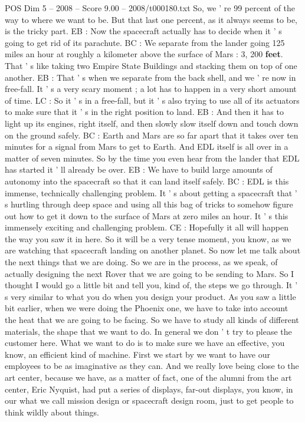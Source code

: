 \begin{textsample}{POS Dim 5 – 2008 – Score 9.00 – 2008/t000180.txt}
So, we ' re 99 percent of the way to where we want to be.
But that last one percent, as it always seems to be, is the tricky part.
EB : Now the spacecraft actually has to decide when it ' s going to get rid of its parachute.
BC : We separate from the lander going 125 miles an hour at roughly a kilometer above the surface of Mars : 3, 200 \textbf{feet}.
That ' s like taking two Empire State Buildings and stacking them on top of one another.
EB : That ' s when we separate from the back shell, and we ' re now in free-fall.
It ' s a very scary moment ; a lot has to happen in a very short amount of time.
LC : So it ' s in a free-fall, but it ' s also trying to use all of its actuators to make sure that it ' s in the right position to land.
EB : And then it has to light up its engines, right itself, and then slowly slow itself down and touch down on the ground safely.
BC : Earth and Mars are so far apart that it takes over ten minutes for a signal from Mars to get to Earth.
And EDL itself is all over in a matter of seven minutes.
So by the time you even hear from the lander that EDL has started it ' ll already be over.
EB : We have to build large amounts of autonomy into the spacecraft so that it can land itself safely.
BC : EDL is this immense, technically challenging problem.
It ' s about getting a spacecraft that ' s hurtling through deep space and using all this bag of tricks to somehow figure out how to get it down to the surface of Mars at zero miles an hour.
It ' s this immensely exciting and challenging problem.
CE : Hopefully it all will happen the way you saw it in here.
So it will be a very tense moment, you know, as we are watching that spacecraft landing on another planet.
So now let me talk about the next things that we are doing.
So we are in the process, as we speak, of actually designing the next Rover that we are going to be sending to Mars.
So I thought I would go a little bit and tell you, kind of, the steps we go through.
It ' s very similar to what you do when you design your product.
As you saw a little bit earlier, when we were doing the Phoenix one, we have to take into account the heat that we are going to be facing.
So we have to study all kinds of different materials, the shape that we want to do.
In general we don ' t try to please the customer here.
What we want to do is to make sure we have an effective, you know, an efficient kind of machine.
First we start by we want to have our employees to be as imaginative as they can.
And we really love being close to the art center, because we have, as a matter of fact, one of the alumni from the art center, Eric Nyquist, had put a series of displays, far-out displays, you know, in our what we call mission design or spacecraft design room, just to get people to think wildly about things.

\end{textsample}
